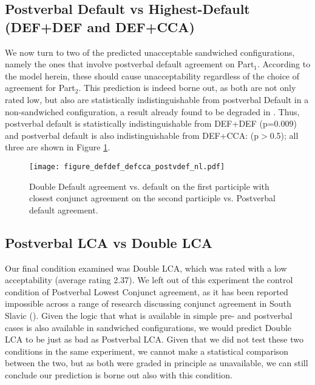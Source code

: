 \documentclass[output=paper
,modfonts
,nonflat]{langsci/langscibook}
\begin{document}
\subsection{Postverbal Default vs Highest-Default (DEF+DEF and DEF+CCA)} \label{sec:postverbaldef}
We now turn to two of the predicted unacceptable sandwiched configurations, namely the ones that involve postverbal default agreement on Part$_1$. According to the model herein, these should cause unacceptability regardless of the choice of agreement for Part$_2$. This prediction is indeed borne out, as both are not only rated low, but also are statistically indistinguishable from postverbal Default in a non-sandwiched configuration, a result already found to be degraded in \citet{willergold:16}. Thus, postverbal default is statistically indistinguishable from DEF+DEF (p=0.009) and postverbal default is also indistinguishable from DEF+CCA: (p$>$0.5); all three are shown in Figure \ref{fig:figure_defdef_defcca_postvdef}.

\begin{figure}[!h]
\begin{center}
\texttt{[image: figure\_defdef\_defcca\_postvdef\_nl.pdf]}
\end{center}
\caption{Double Default agreement vs. default on the first participle with closest conjunct agreement on the second participle vs. Postverbal default agreement.}
\label{fig:figure_defdef_defcca_postvdef}
\end{figure}

\subsection{Postverbal LCA vs Double LCA}
Our final condition examined was Double LCA, which was rated with a low acceptability (average rating 2.37). We left out of this experiment the control condition of Postverbal Lowest Conjunct agreement, as it has been reported impossible across a range of research discussing conjunct agreement in South Slavic (\citealt{marusicnevinsbadecker:15,boskovic:09,puskarmurphy:17,willergold:16}). Given the logic that what is available in simple pre- and postverbal cases is also available in sandwiched configurations, we would predict Double LCA to be just as bad as Postverbal LCA. Given that we did not test these two conditions in the same experiment, we cannot make a statistical comparison between the two, but as both were graded in principle as unavailable, we can still conclude our prediction is borne out also with this condition.
\end{document}
